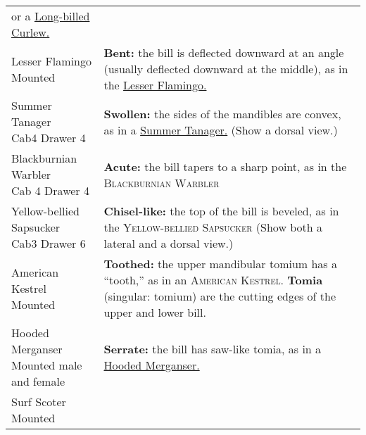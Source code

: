 \documentclass[10pt]{article}
\newif\ifprintkey
\newcommand{\PrintKey}[1]{\ifprintkey{\textbf{#1}}\fi}
\begin{document}
\begin{longtable}{@{}C{0.45\textwidth}L{0.45\textwidth}@{}}
or a \href{https://www.allaboutbirds.org/guide/Long-billed_Curlew}{Long-billed Curlew.} \\ [2.5cm]
%
\PrintKey{Lesser Flamingo \newline Mounted}%
& \textbf{Bent:} the bill is deflected downward at an angle (usually deflected downward at the middle), as in the \href{https://ebird.org/species/grefla2}{Lesser Flamingo.} \\ [2.5cm]
%
\PrintKey{Summer Tanager \newline Cab4 Drawer 4} & 
\textbf{Swollen:} the sides of the mandibles are convex, as in a \href{https://www.allaboutbirds.org/guide/Summer_Tanager}{Summer Tanager.} (Show a dorsal view.)\\ [2.5cm]
%
\PrintKey{Blackburnian Warbler \newline Cab 4 Drawer 4} & 
\textbf{Acute:} the bill tapers to a sharp point, as in the \textsc{Blackburnian Warbler} %
\\ [2.5cm]
%
\PrintKey{Yellow-bellied Sapsucker \newline Cab3 Drawer 6} & 
\textbf{Chisel-like:} the top of the bill is beveled, as in the \textsc{Yellow-bellied Sapsucker} %
(Show both a lateral and a dorsal view.) \\ [2.5cm]
%
\PrintKey{American Kestrel \newline Mounted} & 
\textbf{Toothed:} the upper mandibular tomium has a “tooth,” as in an \textsc{American Kestrel.} %
\textbf{Tomia} (singular: tomium) are the cutting edges of the upper and lower bill.\\ [2.5cm]
%
\PrintKey{Hooded Merganser \newline Mounted male and female} & 
\textbf{Serrate:} the bill has saw-like tomia, as in a \href{https://www.allaboutbirds.org/guide/Hooded_Merganser}{Hooded Merganser.} \\ [2.5cm]
%
\PrintKey{Surf Scoter \newline Mounted} %

\end{longtable}
\end{document}
